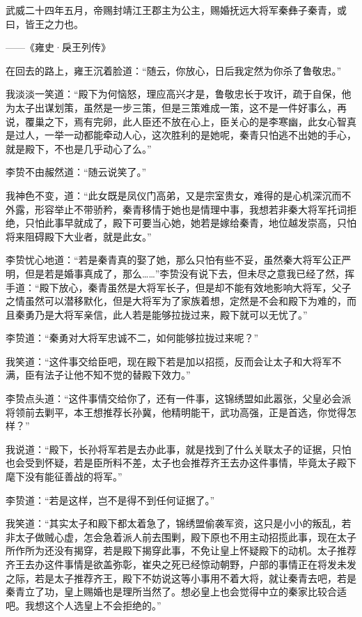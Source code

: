 武威二十四年五月，帝赐封靖江王郡主为公主，赐婚抚远大将军秦彝子秦青，或曰，皆王之力也。

——《雍史·戾王列传》

在回去的路上，雍王沉着脸道：“随云，你放心，日后我定然为你杀了鲁敬忠。”

我淡淡一笑道：“殿下为何恼怒，理应高兴才是，鲁敬忠长于攻讦，疏于自保，他为太子出谋划策，虽然是一步三策，但是三策难成一策，这不是一件好事么，再说，覆巢之下，焉有完卵，此人臣还不放在心上，臣关心的是李寒幽，此女心智真是过人，一举一动都能牵动人心，这次胜利的是她呢，秦青只怕逃不出她的手心，就是殿下，不也是几乎动心了么。”

李贽不由赧然道：“随云说笑了。”

我神色不变，道：“此女既是凤仪门高弟，又是宗室贵女，难得的是心机深沉而不外露，形容举止不带骄矜，秦青移情于她也是情理中事，我想若非秦大将军托词拒绝，只怕此事早就成了，殿下可要当心她，她若是嫁给秦青，地位越发崇高，只怕将来阻碍殿下大业者，就是此女。”

李贽忧心地道：“若是秦青真的娶了她，那么只怕有些不妥，虽然秦大将军公正严明，但是若是婚事真成了，那么……”李贽没有说下去，但未尽之意我已经了然，挥手道：“殿下放心，秦青虽然是大将军长子，但是却不能有效地影响大将军，父子之情虽然可以潜移默化，但是大将军为了家族着想，定然是不会和殿下为难的，而且秦勇乃是大将军亲信，此人若是能够拉拢过来，殿下就可以无忧了。”

李贽道：“秦勇对大将军忠诚不二，如何能够拉拢过来呢？”

我笑道：“这件事交给臣吧，现在殿下若是加以招揽，反而会让太子和大将军不满，臣有法子让他不知不觉的替殿下效力。”

李贽点头道：“这件事情交给你了，还有一件事，这锦绣盟如此嚣张，父皇必会派将领前去剿平，本王想推荐长孙冀，他精明能干，武功高强，正是首选，你觉得怎样？”

我说道：“殿下，长孙将军若是去办此事，就是找到了什么关联太子的证据，只怕也会受到怀疑，若是臣所料不差，太子也会推荐齐王去办这件事情，毕竟太子殿下麾下没有能征善战的将军。”

李贽道：“若是这样，岂不是得不到任何证据了。”

我笑道：“其实太子和殿下都太着急了，锦绣盟偷袭军资，这只是小小的叛乱，若非太子做贼心虚，怎会急着派人前去围剿，殿下原也不用主动招揽此事，现在太子所作所为还没有揭穿，若是殿下揭穿此事，不免让皇上怀疑殿下的动机。太子推荐齐王去办这件事情是欲盖弥彰，崔央之死已经惊动朝野，户部的事情正在将发未发之际，若是太子推荐齐王，殿下不妨说这等小事用不着大将，就让秦青去吧，若是秦青立了功，皇上赐婚也是理所当然了。想必皇上也会觉得中立的秦家比较合适吧。我想这个人选皇上不会拒绝的。”

